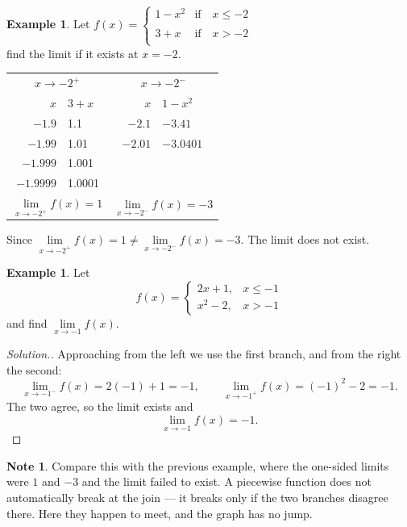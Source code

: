 \documentclass[11pt,a4paper]{article}
\theoremstyle{definition}
\newtheorem{example}[thm]{Example}
\newtheorem{note}[thm]{Note}
\newenvironment{solution}
  {\renewcommand{\qedsymbol}{}\begin{proof}[\textit{Solution}.]}
  {\end{proof}}
\begin{document}
\begin{example}

Let $f(x)=
\begin{cases}
1-x^2 & \text{if}\quad  x\leq -2\\\\
3+x & \text{if}\quad  x>-2\\
\end{cases}
$\\


find the limit if it exists at $x=-2$.\\


\begin{table}[H]
\centering
\begin{tabular}{rl@{\qquad\qquad}rl}
\multicolumn{2}{c}{$x\longrightarrow -2^{+}$} &
\multicolumn{2}{c}{$x\longrightarrow -2^{-}$}\\
$x$ & $3+x$ & $x$ & $1-x^{2}$\\
$-1.9$ & 1.1 & $-2.1$ & $-3.41$\\
$-1.99$ & 1.01 & $-2.01$ & $-3.0401$\\
$-1.999$ & 1.001 & & \\
$-1.9999$ & 1.0001 & & \\[4pt]
\multicolumn{2}{c}{$\lim\limits_{x\to-2^{+}}f(x)=1$} &
\multicolumn{2}{c}{$\lim\limits_{x\to-2^{-}}f(x)=-3$}\\
\end{tabular}
\end{table}




Since $\lim\limits_{x\longrightarrow -2^+}f(x)=1\neq \lim\limits_{x\longrightarrow -2^-}f(x)=-3.$ The limit does not exist.
\end{example}
\begin{example}
Let
$$f(x)=
\begin{cases}
2x+1, & x\leq -1\\
x^{2}-2, & x>-1
\end{cases}$$
and find $\lim\limits_{x\to -1}f(x)$.
\end{example}

\begin{solution}
Approaching from the left we use the first branch, and from the right the second:
$$\lim_{x\to -1^{-}}f(x)=2(-1)+1=-1,\qquad 
\lim_{x\to -1^{+}}f(x)=(-1)^{2}-2=-1 .$$
The two agree, so the limit exists and
$$\lim_{x\to -1}f(x)=-1 .$$
\end{solution}

\begin{note}
Compare this with the previous example, where the one-sided limits were $1$ and
$-3$ and the limit failed to exist. A piecewise function does not automatically
break at the join --- it breaks only if the two branches disagree there. Here they
happen to meet, and the graph has no jump.
\end{note}
\end{document}
